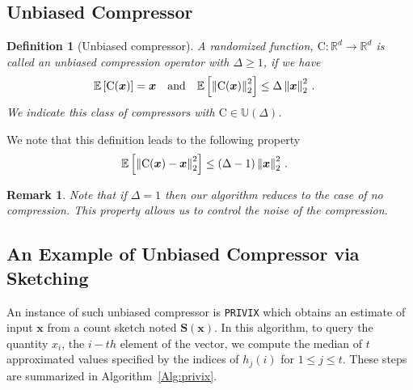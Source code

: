\documentclass[twoside]{article}
\newtheorem{remark}{Remark}
\newtheorem{definition}{Definition}
\begin{document}
\subsection{Unbiased Compressor}
\begin{definition}[Unbiased compressor]
A randomized function, $\text{C}:\mathbb{R}^{d}\rightarrow\mathbb{R}^{d}$ is called an unbiased compression operator with $\Delta\geq 1$, if we have 
\begin{align}\notag
\mathbb{E}\left[\text{C}(\boldsymbol{x})\right]&=\boldsymbol{x}\nonumber \quad \textrm{and} \quad    \mathbb{E}\left[\left\|\text{C}(\boldsymbol{x})\right\|^2_2\right] \leq \Delta\left\|\boldsymbol{x}\right\|^2_2\notag \, .
\end{align}
We indicate this class of compressors with $\text{C}\in\mathbb{U}(\Delta)$.
\end{definition}
We note that this definition leads to the following property 
\begin{align}\notag
    \mathbb{E}\left[\left\|\text{C}(\boldsymbol{x})-\boldsymbol{x}\right\|^2_2\right]&\leq \left(\Delta-1\right)\left\|\boldsymbol{x}\right\|^2_2\, .
\end{align}
\begin{remark}
Note that if $\Delta=1$ then our algorithm reduces to the case of no compression. 
This property allows us to control the noise of the compression.
\end{remark}

\subsection{An Example of Unbiased Compressor via Sketching}
An instance of such unbiased compressor is \texttt{PRIVIX} which obtains an estimate of input $\boldsymbol{x}$ from a count sketch noted $\boldsymbol{S}(\boldsymbol{x})$. 
In this algorithm, to query the quantity $x_i$, the $i-th$ element of the vector, we compute the median of $t$ approximated values specified by the indices of $h_j(i)$ for $1\leq j\leq t$. These steps are summarized in Algorithm~\ref{Alg:privix}.

\begin{algorithm}[t]
\caption{\texttt{PRIVIX} \cite{li2019privacy}: Unbiased compressor based on sketching. }\label{Alg:privix}
\begin{algorithmic}[1]
\vspace{- 0.1cm}
\end{algorithmic}
\end{algorithm}
 
\end{document}
